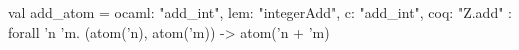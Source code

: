 val add_atom = {ocaml: "add_int", lem: "integerAdd", c: "add_int", coq: "Z.add"} : forall 'n 'm.
  (atom('n), atom('m)) -> atom('n + 'm)
